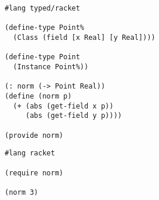 \begin{minipage}[t]{0.4\textwidth}
\flushleft
\begin{verbatim}
#lang typed/racket

(define-type Point%
  (Class (field [x Real] [y Real])))

(define-type Point
  (Instance Point%))

(: norm (-> Point Real))
(define (norm p)
  (+ (abs (get-field x p))
     (abs (get-field y p))))

(provide norm)
\end{verbatim}
\end{minipage}%
\hfill%
\begin{minipage}[t]{0.4\textwidth}
  \flushright
  \begin{verbatim}
#lang racket

(require norm)

(norm 3)
\end{verbatim}
\end{minipage}
